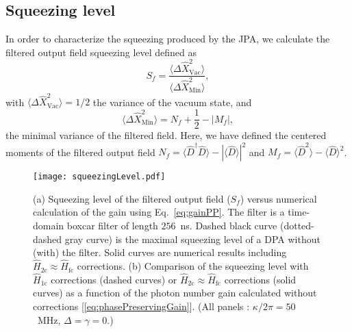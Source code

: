 \documentclass[pra,twocolumn,superscriptaddress]{revtex4-1}
\newcommand{\corrSinglePump}[0]{\hat{H}_{\mathrm{1c}}}
\newcommand{\corrDoublePump}[0]{\hat{H}_{\mathrm{2c}}}
\newcommand{\corrFluxPump}[0]{\hat{H}_{\mathrm{fc}}}
\newcommand{\abs}[1]{\left|#1\right|}
\begin{document}
% 
\subsection{Squeezing level}\label{subsec:squeezingLevel}
In order to characterize the squeezing produced by the JPA, we calculate the filtered output field squeezing level defined as~\cite{Zhong:2013vn}
\begin{equation}
	S_f = 
			\frac{
		 \langle \Delta \hat X^2_{\mathrm{Vac}} \rangle 
		}{ 
		\langle \Delta \hat X^2_{\mathrm{Min} }  \rangle
		}
	,
	\label{eq:sqLevel}
\end{equation}
with
$ \langle \Delta \hat X^2_{\mathrm{Vac}} \rangle  =1/2 $
the variance of the vacuum state, and
\begin{equation}
	 \langle \Delta \hat X^2_{\mathrm{Min} }  \rangle
	=N_f + \frac{1}{2} - \abs{M_f}
	,
\end{equation}
the minimal variance of the filtered field. Here, we have defined the centered moments of the filtered output field $N_f = \langle \hat D^\dag \hat D \rangle-|\langle \hat D \rangle |^2 $ and $M_f = \langle \hat D^2 \rangle-\langle \hat D \rangle^2$.

\begin{figure}[tb]
	\texttt{[image: squeezingLevel.pdf]}
	\caption{
	(a) Squeezing level of the filtered output field ($S_f$) versus numerical calculation of the gain using Eq.~\eqref{eq:gainPP}. 
	The filter is a time-domain boxcar filter of length $256$~ns.
	Dashed black curve (dotted-dashed gray curve) is the maximal squeezing level of a DPA without (with) the filter.
	Solid curves are numerical results including 
	$\corrDoublePump \approx \corrFluxPump$ corrections.
	(b)
	Comparison of the squeezing level with $\corrSinglePump$ corrections (dashed curves) or $\corrDoublePump \approx \corrFluxPump$ corrections  (solid curves)  as a function of the photon number gain calculated without corrections [\eqref{eq:phasePreservingGain}].
	(All panels : $\kappa/2\pi=50$~MHz, $\Delta=\gamma=0$.)
	}
	\label{fig:gainAndSqueezingNum}
\end{figure}
\end{document}
